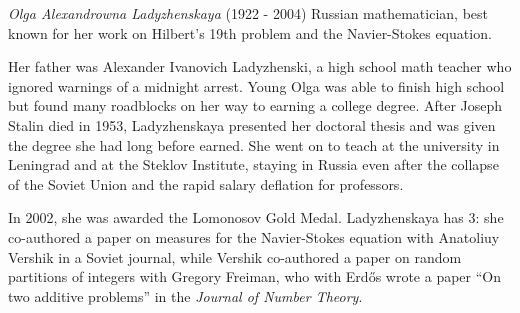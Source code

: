 \documentclass[12pt]{article}
\begin{document}

\emph{Olga Alexandrowna Ladyzhenskaya} (1922 - 2004) Russian mathematician, best known for her work on Hilbert's 19th problem and the Navier-Stokes equation.

Her father was Alexander Ivanovich Ladyzhenski, a high school math teacher who ignored warnings of a midnight arrest. Young Olga was able to finish high school but found many roadblocks on her way to earning a college degree. After Joseph Stalin died in 1953, Ladyzhenskaya presented her doctoral thesis and was given the degree she had long before earned. She went on to teach at the university in Leningrad and at the Steklov Institute, staying in Russia even after the collapse of the Soviet Union and the rapid salary deflation for professors.

In 2002, she was awarded the Lomonosov Gold Medal. Ladyzhenskaya has  3: she co-authored a paper on measures for the Navier-Stokes equation with Anatoliuy Vershik in a Soviet journal, while Vershik co-authored a paper on random partitions of integers with Gregory Freiman, who with Erd\H{o}s wrote a paper ``On two additive problems'' in the {\it Journal of Number Theory}.
\end{document}
